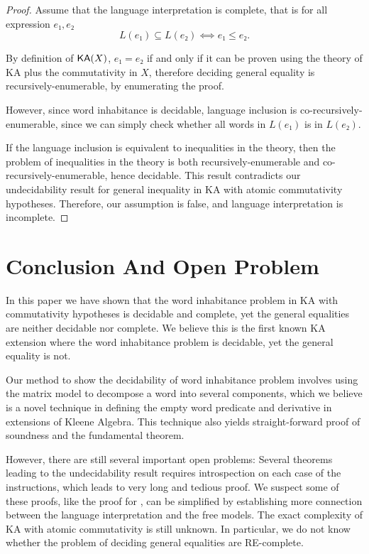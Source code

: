\begin{proof}
  Assume that the language interpretation is complete,
  that is for all expression \(e₁, e₂\)
  \[L(e₁) ⊆ L(e₂) ⟺ e₁ ≤ e₂.\]

  By definition of \(\mathsf{KA}(X)\), 
  \(e₁ = e₂\) if and only if it can be proven using the theory of KA 
  plus the commutativity in \(X\),
  therefore deciding general equality is recursively-enumerable, by enumerating the proof.

  However, since word inhabitance is decidable,
  language inclusion is co-recursively-enumerable,
  since we can simply check whether all words in \(L(e₁)\) is in \(L(e₂)\).

  If the language inclusion is equivalent to inequalities in the theory,
  then the problem of inequalities in the theory is both recursively-enumerable
  and co-recursively-enumerable, hence decidable.
  This result contradicts our undecidability result for general inequality in 
  KA with atomic commutativity hypotheses.
  Therefore, our assumption is false, and language interpretation is incomplete.
\end{proof} 

\section{Conclusion And Open Problem}

In this paper we have shown that the word inhabitance problem 
in KA with commutativity hypotheses is decidable and complete,
yet the general equalities are neither decidable nor complete.
We believe this is the first known KA extension 
where the word inhabitance problem is decidable,
yet the general equality is not.

Our method to show the decidability of word inhabitance problem
involves using the matrix model to decompose a word into several components,
which we believe is a novel technique in defining 
the empty word predicate and derivative in extensions of Kleene Algebra.
This technique also yields straight-forward proof of soundness and the fundamental theorem.

However, there are still several important open problems:
Several theorems leading to the undecidability result requires 
introspection on each case of the instructions, 
which leads to very long and tedious proof.
We suspect some of these proofs, like the proof for , 
can be simplified by establishing more 
connection between the language interpretation and the free models.
The exact complexity of KA with atomic commutativity is still unknown.
In particular, we do not know whether the problem of 
deciding general equalities are RE-complete.

